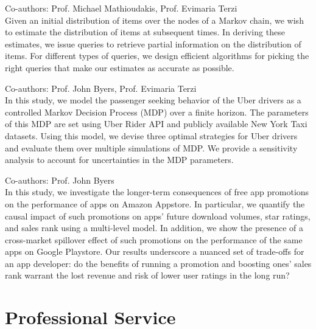 \documentclass[10pt]{moderncv}
\begin{document}
{
    Co-authors: Prof. Michael Mathioudakis, Prof. Evimaria Terzi\\
    Given an initial distribution of items over the nodes of a Markov chain, we wish to estimate the distribution of 
        items at subsequent times. In deriving these estimates, we issue queries to retrieve partial information on the 
        distribution of items. 
    For different types of queries, we design efficient algorithms for picking the right queries that make our 
        estimates as accurate as possible.
}

{
    Co-authors: Prof. John Byers, Prof. Evimaria Terzi\\
    In this study, we model the passenger seeking behavior of the Uber drivers as a controlled Markov Decision Process 
        (MDP) over a finite horizon. 
    The parameters of this MDP are set using Uber Rider API and publicly available New York Taxi datasets.
    Using this model, we devise three optimal strategies for Uber drivers and evaluate them over multiple simulations 
        of MDP. 
    We provide a sensitivity analysis to account for uncertainties in the MDP parameters.
}

{
    Co-authors: Prof. John Byers\\
    In this study, we investigate the longer-term consequences of free app promotions on the performance of apps on 
        Amazon Appstore. 
    In particular, we quantify the causal impact of such promotions on apps’ future download volumes, star ratings, and 
        sales rank using a multi-level model. 
    In addition, we show the presence of a cross-market spillover effect of such promotions on the performance of the 
        same apps on Google Playstore. 
    Our results underscore a nuanced set of trade-offs for an app developer: do the benefits of running a promotion and 
        boosting ones’ sales rank warrant the lost revenue and risk of lower user ratings in the long run?
}

\section{Professional Service}
\end{document}
